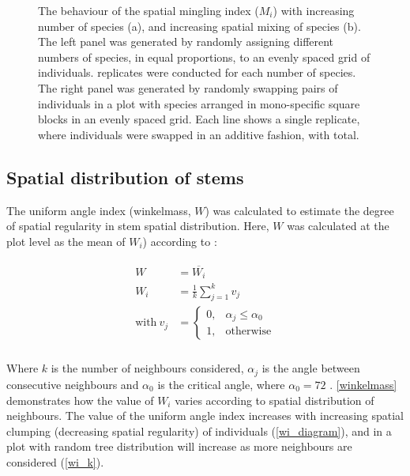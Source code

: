 \documentclass[11pt,a4paper]{article}
\begin{document}
\begin{figure}
\begin{subfigure}{0.45\linewidth}
		\caption{}
		\label{mingling_nmingl}
	\end{subfigure}
	\caption{The behaviour of the spatial mingling index ($M_{i}$) with increasing number of species (a), and increasing spatial mixing of species (b). The left panel was generated by randomly assigning different numbers of species, in equal proportions, to an evenly spaced grid of individuals. \mispreps{} replicates were conducted for each number of species. The right panel was generated by randomly swapping pairs of individuals in a plot with \minsp{} species arranged in mono-specific square blocks in an evenly spaced grid. Each line shows a single replicate, where individuals were swapped in an additive fashion, with \minreps{} total.} 
	\label{mingling_both}
\end{figure}

\subsection{Spatial distribution of stems}

The uniform angle index (winkelmass, $W$) was calculated to estimate the degree of spatial regularity in stem spatial distribution. Here, $W$ was calculated at the plot level as the mean of $W_{i}$) according to \citet{Gadow2002}: 

\begin{align}
\begin{split}
	W &= \overline{W_{i}} \\
	W_{i} &= \frac{1}{k} \sum_{j=1}^{k} v_{j} \\
	\text{with}\ v_{j} &= \begin{cases}
		0,& \alpha_{j} \le \alpha_{0} \\
		1,& \text{otherwise}
	\end{cases} \\
\end{split}
\end{align}

Where $k$ is the number of neighbours considered, $\alpha_{j}$ is the angle between consecutive neighbours and $\alpha_{0}$ is the critical angle, where $\alpha_{0} = 72$\textdegree{} \citep{Hui2002}. \autoref{winkelmass} demonstrates how the value of $W_{i}$ varies according to spatial distribution of neighbours. The value of the uniform angle index increases with increasing spatial clumping (decreasing spatial regularity) of individuals (\autoref{wi_diagram}), and in a plot with random tree distribution will increase as more neighbours are considered (\autoref{wi_k}). 
\end{document}
